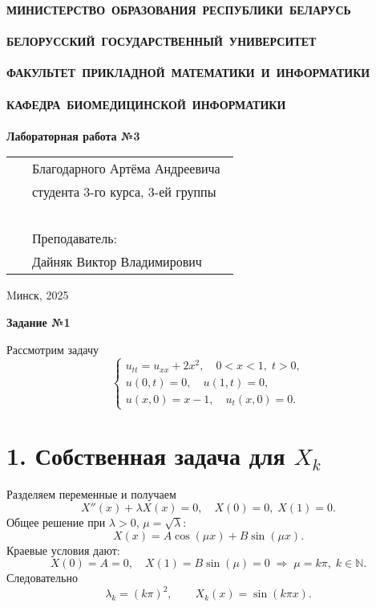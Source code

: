 \documentclass[a4paper,12pt]{article}
\begin{document}
\setcounter{page}{1}
\thispagestyle{empty}
\begin{center}
\bf
\vspace{4cm}
{
\mbox{МИНИСТЕРСТВО~ОБРАЗОВАНИЯ~РЕСПУБЛИКИ~БЕЛАРУСЬ} \\~\\
\mbox{БЕЛОРУССКИЙ~ГОСУДАРСТВЕННЫЙ~УНИВЕРСИТЕТ} \\~\\
\mbox{ФАКУЛЬТЕТ~ПРИКЛАДНОЙ~МАТЕМАТИКИ~И~ИНФОРМАТИКИ} \\~\\
\mbox{КАФЕДРА~БИОМЕДИЦИНСКОЙ~ИНФОРМАТИКИ} \\~\\
}
\vspace{4cm}
\bf
\rm Лабораторная работа №3
\vspace{6cm}
\end{center}
\begin{tabular}{ll}
\hspace{10.5cm}
&Благодарного Артёма Андреевича~\\
&студента 3-го курса, 3-ей группы\\~\\
&Преподаватель:\\
&Дайняк Виктор Владимирович
\end{tabular}
\vspace{7cm}
\begin{center}
Mинск, 2025
\end{center}
\clearpage
\restoregeometry

\begin{center}    
\noindent \textbf{Задание №1}
\end{center}

Рассмотрим задачу
\[
\begin{cases}
u_{tt}=u_{xx}+2x^2,\quad 0<x<1,\;t>0,\\
u(0,t)=0,\quad u(1,t)=0,\\
u(x,0)=x-1,\quad u_t(x,0)=0.
\end{cases}
\]

\section*{1. Собственная задача для $X_k$}

Разделяем переменные и получаем
\[
X''(x)+\lambda X(x)=0,\quad X(0)=0,\;X(1)=0.
\]
Общее решение при $\lambda>0$, $\mu=\sqrt\lambda$:
\[
X(x)=A\cos(\mu x)+B\sin(\mu x).
\]
Краевые условия дают:
\[
X(0)=A=0,\quad X(1)=B\sin(\mu)=0\;\Rightarrow\;\mu=k\pi,\;k\in\mathbb{N}.
\]
Следовательно
\[
\lambda_k=(k\pi)^2,\qquad X_k(x)=\sin(k\pi x).
\]
\end{document}
